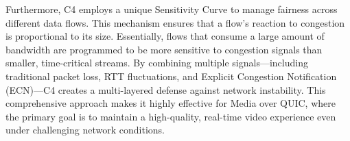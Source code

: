 Furthermore, C4 employs a unique Sensitivity Curve to manage fairness across different data flows\cite{C4}. 
This mechanism ensures that a flow's reaction to congestion is proportional to its size\cite{C4}.
Essentially, flows that consume a large amount of bandwidth are programmed to be more sensitive to congestion signals than smaller, time-critical streams\cite{C4}. 
By combining multiple signals—including traditional packet loss, RTT fluctuations, and Explicit Congestion Notification (ECN)—C4 creates a multi-layered defense against network instability\cite{C4}. 
This comprehensive approach makes it highly effective for Media over QUIC, where the primary goal is to maintain a high-quality, real-time video experience even under challenging network conditions\cite{C4}.

